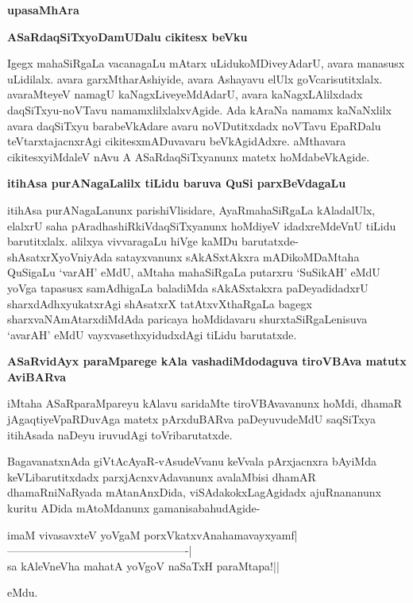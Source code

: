 \begin{center}
\textbf{upasaMhAra}
\end{center}

\noindent
\textbf{ASaRdaqSiTxyoDamUDalu cikitesx beVku}\label{page61}

Igegx mahaSiRgaLa vacanagaLu mAtarx uLidukoMDiveyAdarU, avara manasusx uLidilalx. avara garxMtharAshiyide, avara Ashayavu elUlx goVcarisutitxlalx. avaraMteyeV namagU kaNagxLiveyeMdAdarU, avara kaNagxLAlilxdadx daqSiTxyu-noVTavu namamxlilxlalxvAgide. Ada kAraNa namamx kaNaNxlilx avara daqSiTxyu barabeVkAdare avaru noVDutitxdadx noVTavu EpaRDalu teVtarxtajacnxrAgi cikitesxmADuvavaru beVkAgidAdxre. aMthavara cikitesxyiMdaleV nAvu A ASaRdaqSiTxyanunx matetx hoMdabeVkAgide.

\noindent
\textbf{itihAsa purANagaLalilx tiLidu baruva QuSi parxBeVdagaLu}\label{page62}

itihAsa purANagaLanunx parishiVlisidare, AyaRmahaSiRgaLa kAladalUlx, elalxrU saha pAradhashiRkiVdaqSiTxyanunx hoMdiyeV idadxreMdeVnU tiLidu barutitxlalx. alilxya vivvaragaLu hiVge kaMDu barutatxde- shAsatxrXyoVniyAda satayxvanunx sAkASxtAkxra mADikoMDaMtaha QuSigaLu `varAH' eMdU, aMtaha mahaSiRgaLa putarxru `SuSikAH' eMdU yoVga tapasusx samAdhigaLa baladiMda sAkASxtakxra paDeyadidadxrU sharxdAdhxyukatxrAgi shAsatxrX tatAtxvXthaRgaLa bagegx sharxvaNAmAtarxdiMdAda paricaya hoMdidavaru shurxtaSiRgaLenisuva `avarAH' eMdU vayxvasethxyidudxdAgi tiLidu barutatxde.

\noindent
\textbf{ASaRvidAyx paraMparege kAla vashadiMdodaguva tiroVBAva matutx AviBARva}\label{page92}

iMtaha ASaRparaMpareyu kAlavu saridaMte tiroVBAvavanunx hoMdi, dhamaR jAgaqtiyeVpaRDuvAga matetx pArxduBARva paDeyuvudeMdU saqSiTxya itihAsada naDeyu iruvudAgi toVribarutatxde.

BagavanatxnAda giVtAcAyaR-vAsudeVvanu keVvala pArxjacnxra bAyiMda keVLibarutitxdadx parxjAcnxvAdavanunx avalaMbisi dhamAR dhamaRniNaRyada mAtanAnxDida, viSAdakokxLagAgidadx ajuRnananunx kuritu ADida mAtoMdanunx gamanisabahudAgide-

\begin{shloka}
imaM vivasavxteV yoVgaM porxVkatxvAnahamavayxyamf|\\\label{62}
-------------------------------------------------|\\
sa kAleVneVha mahatA yoVgoV naSaTxH paraMtapa!|| 
\end{shloka}

eMdu.

